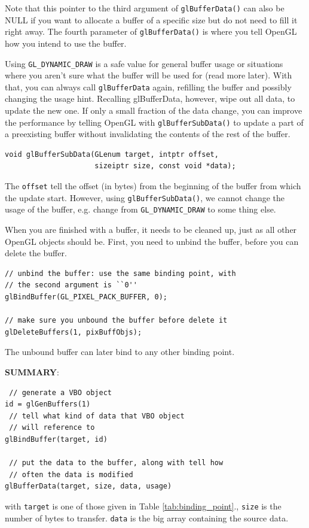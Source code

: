 \begin{framed}
  Note that this pointer to the third argument of
  \verb!glBufferData()! can also be NULL if you want to allocate a
  buffer of a specific size but do not need to fill it right away. The
  fourth parameter of \verb!glBufferData()! is where you tell OpenGL
  how you intend to use the buffer.
\end{framed}


Using \verb!GL_DYNAMIC_DRAW! is a safe value for general buffer usage
or situations where you aren't sure what the buffer will be used for
(read more later).  With that, you can always call \verb!glBufferData!
again, refilling the buffer and possibly changing the usage
hint. Recalling glBufferData, however, wipe out all data, to update
the new one. If only a small fraction of the data change, you can
improve the performance by telling OpenGL with
\verb!glBufferSubData()! to update a part of a preexisting buffer
without invalidating the contents of the rest of the buffer.

\begin{verbatim}
void glBufferSubData(GLenum target, intptr offset, 
                     sizeiptr size, const void *data);
\end{verbatim}
The \verb!offset! tell the offset (in bytes) from the beginning of the
buffer from which the update start. However, using
\verb!glBufferSubData()!, we cannot change the usage of the buffer,
e.g. change from \verb!GL_DYNAMIC_DRAW! to some thing else. 

When you are finished with a buffer, it needs to be cleaned up, just
as all other OpenGL objects should be. First, you need to unbind the
buffer, before you can delete the buffer.
\begin{verbatim}
// unbind the buffer: use the same binding point, with 
// the second argument is ``0'' 
glBindBuffer(GL_PIXEL_PACK_BUFFER, 0);

// make sure you unbound the buffer before delete it
glDeleteBuffers(1, pixBuffObjs);
\end{verbatim}
The unbound buffer can later bind to any other binding point. 



{\bf SUMMARY}: 
\begin{verbatim}
 // generate a VBO object
id = glGenBuffers(1)
 // tell what kind of data that VBO object
 // will reference to
glBindBuffer(target, id)

 // put the data to the buffer, along with tell how
 // often the data is modified
glBufferData(target, size, data, usage)
\end{verbatim}
with \verb!target! is one of those given in Table
\ref{tab:binding_point}., \verb!size! is the number of bytes to
transfer. \verb!data! is the big array containing the source data.

